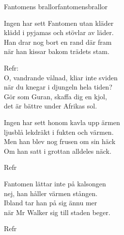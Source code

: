 \begin{song}{Fantomens brallor}{fantomensbrallor}
\begin{vers}
Ingen har sett Fantomen utan kläder\\
klädd i pyjamas och stövlar av läder.\\
Han drar nog bort en rand där fram\\
när han kissar bakom trädets stam.\\
\end{vers}
\begin{vers}
Refr:\\
O, vandrande vålnad, kliar inte sviden\\
när du knegar i djungeln hela tiden?\\
Gör som Guran, skaffa dig en kjol,\\
det är bättre under Afrikas sol.\\
\end{vers}
\begin{vers}
Ingen har sett honom kavla upp ärmen\\
ljusblå lekdräkt i fukten och värmen.\\
Men han blev nog frusen om sin häck\\
Om han satt i grottan alldeles näck.\\
\end{vers}
\begin{vers}
Refr\\
\end{vers}
\begin{vers}
Fantomen lättar inte på kalsongen\\
nej, han håller värmen stången.\\
Ibland tar han på sig ännu mer\\
när Mr Walker sig till staden beger.\\
\end{vers}
\begin{vers}
Refr\\
\end{vers}
\end{song}
